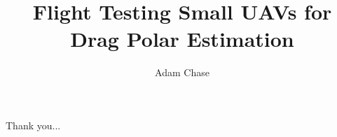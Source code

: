 \documentclass[12pt]{ucthesis}
\title{Flight Testing Small UAVs for Drag Polar Estimation}
\author{Adam Chase}
\begin{document}
\maketitle

\begin{frontmatter}
	
	\copyrightpage
	\committeemembershippage

\begin{abstract}


\end{abstract}

\begin{acknowledgements}

   Thank you...

\end{acknowledgements}


\tableofcontents


\listoftables

\listoffigures

\end{frontmatter}

\pagestyle{plain}


\renewcommand{\baselinestretch}{1.66}




















\clearpage
\begin{appendices}

%
\end{appendices}


\clearpage



\end{document}
